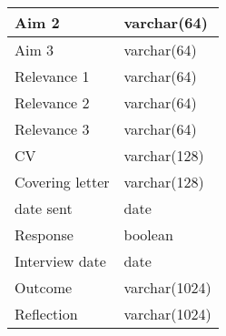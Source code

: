 \documentclass[a4paper, twoside]{article}
\begin{document}
\begin{tabular}{|l|l|}
Aim 2 & varchar(64) \\ \hline
Aim 3 & varchar(64) \\ \hline
Relevance 1 & varchar(64) \\ \hline
Relevance 2 & varchar(64) \\ \hline
Relevance 3 & varchar(64) \\ \hline
CV & varchar(128) \\ \hline
Covering letter & varchar(128) \\ \hline
date sent & date \\ \hline
Response & boolean \\ \hline
Interview date & date \\ \hline
Outcome & varchar(1024) \\ \hline
Reflection & varchar(1024) \\
\hline
\end{tabular}
\end{document}
